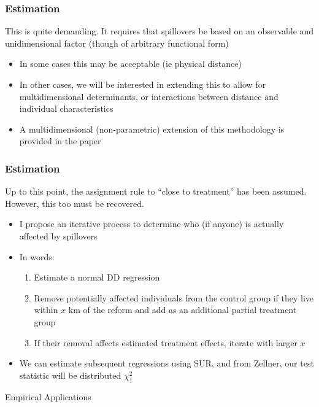 \documentclass[10pt,letterpaper,subeqn]{beamer}
\begin{document}


\begin{frame}[label=estim8]
  \frametitle{Estimation}
This is quite demanding.  It requires that spillovers be based on an observable 
and unidimensional factor (though of arbitrary functional form)
\vspace{4mm}
\begin{itemize}
\item In some cases this may be acceptable (ie physical distance)
\item In other cases, we will be interested in extending this to allow for 
multidimensional determinants, or interactions between distance and individual
characteristics
\item A multidimensional (non-parametric) extension of this methodology is 
provided in the paper
\end{itemize}
\end{frame}


\begin{frame}[label=estim9]
  \frametitle{Estimation}
Up to this point, the assignment rule to ``close to treatment'' has been assumed.  
However, this too must be recovered.
\vspace{5mm}
\begin{itemize}
\item I propose an iterative process to determine who (if anyone) is actually 
affected by spillovers
\item In words:
\begin{enumerate}
\item Estimate a normal DD regression
\item Remove potentially affected individuals from the control group if they live
within $x$ km of the reform and add as an additional partial treatment group
\item If their removal affects estimated treatment effects, iterate with larger
$x$
\end{enumerate}
\item We can estimate subsequent regressions using SUR, and from Zellner, our 
test statistic will be distributed $\chi^2_1$
\end{itemize}
\end{frame}

\begin{frame}
\begin{center}
\Large Empirical Applications
\end{center}
\end{frame}
\end{document}

